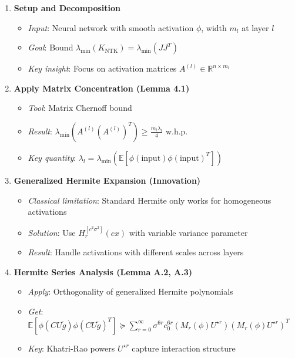\documentclass{article}
\newcommand{\E}{\mathbb{E}}
\newcommand{\R}{\mathbb{R}}
\newcommand{\evmin}[1]{\lambda_{\min}\left(#1\right)}
\newcommand{\KNTK}{K_{\text{NTK}}}
\newcommand{\lambdaMin}{\lambda_{\min}}
\begin{document}
\begin{enumerate}
    \item \textbf{Setup and Decomposition}
    \begin{itemize}
        \item \textit{Input}: Neural network with smooth activation $\phi$, width $m_l$ at layer $l$
        \item \textit{Goal}: Bound $\lambdaMin(\KNTK) = \lambdaMin(JJ^T)$
        \item \textit{Key insight}: Focus on activation matrices $A^{(l)} \in \R^{n \times m_l}$
    \end{itemize}
    
    \item \textbf{Apply Matrix Concentration (Lemma 4.1)}
    \begin{itemize}
        \item \textit{Tool}: Matrix Chernoff bound
        \item \textit{Result}: $\evmin{A^{(l)}(A^{(l)})^T} \geq \frac{m_l \lambda_l}{4}$ w.h.p.
        \item \textit{Key quantity}: $\lambda_l = \evmin{\E[\phi(\text{input}) \phi(\text{input})^T]}$
    \end{itemize}
    
    \item \textbf{Generalized Hermite Expansion (Innovation)}
    \begin{itemize}
        \item \textit{Classical limitation}: Standard Hermite only works for homogeneous activations
        \item \textit{Solution}: Use $H_r^{[c^2\sigma^2]}(cx)$ with variable variance parameter
        \item \textit{Result}: Handle activations with different scales across layers
    \end{itemize}
    
    \item \textbf{Hermite Series Analysis (Lemma A.2, A.3)}
    \begin{itemize}
        \item \textit{Apply}: Orthogonality of generalized Hermite polynomials
        \item \textit{Get}: $\E[\phi(CU\tilde{g}) \phi(CU\tilde{g})^T] \succeq \sum_{r=0}^{\infty} \sigma^{6r} c_0^{6r} (M_r(\phi) U^{\star r})(M_r(\phi) U^{\star r})^T$
        \item \textit{Key}: Khatri-Rao powers $U^{\star r}$ capture interaction structure
    \end{itemize}
    

\end{enumerate}
\end{document}
